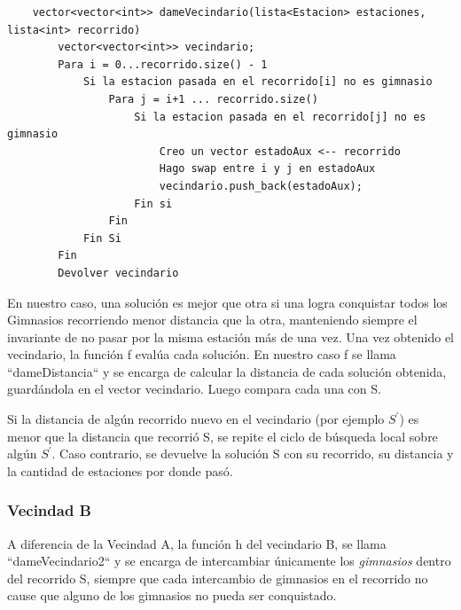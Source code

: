     \begin{codesnippet}
    \begin{verbatim}
    vector<vector<int>> dameVecindario(lista<Estacion> estaciones, lista<int> recorrido)
        vector<vector<int>> vecindario;
        Para i = 0...recorrido.size() - 1
            Si la estacion pasada en el recorrido[i] no es gimnasio
                Para j = i+1 ... recorrido.size()
                    Si la estacion pasada en el recorrido[j] no es gimnasio
                        Creo un vector estadoAux <-- recorrido
                        Hago swap entre i y j en estadoAux
                        vecindario.push_back(estadoAux);
                    Fin si
                Fin
            Fin Si
        Fin
        Devolver vecindario
    \end{verbatim}
    \end{codesnippet}

    En nuestro caso, una solución es mejor que otra si una logra conquistar todos los Gimnasios recorriendo menor distancia que la otra, manteniendo siempre el invariante de no pasar por la misma estación más de una vez. 
    Una vez obtenido el vecindario, la función f evalúa cada solución. En nuestro caso f se llama “dameDistancia“ y se encarga de calcular la distancia de cada solución obtenida, guardándola en el vector vecindario. Luego compara cada una con S. 
    \par Si la distancia de algún recorrido nuevo en el vecindario (por ejemplo $S^{'}$) es menor que la distancia que recorrió S, se repite el ciclo de búsqueda local sobre algún $S^{'}$. Caso contrario, se devuelve la solución S con su recorrido, su distancia y la cantidad de estaciones por donde pasó.

   \subsubsection{Vecindad B}

    \par A diferencia de la Vecindad A, la función h del vecindario B, se llama “dameVecindario2“ y se encarga de intercambiar únicamente los \emph{gimnasios} dentro del recorrido S, siempre que cada intercambio de gimnasios en el recorrido no cause que alguno de los gimnasios no pueda ser conquistado.


